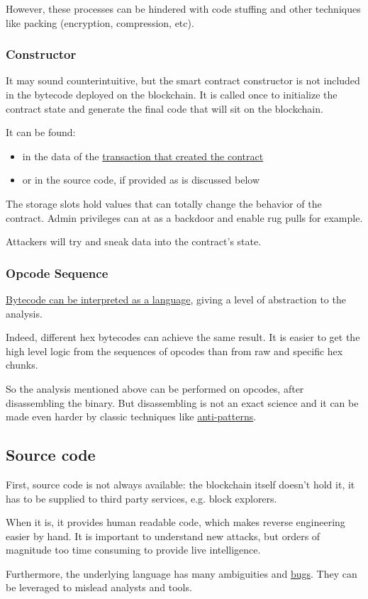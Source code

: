 However, these processes can be hindered with code stuffing and other techniques like packing (encryption, compression, etc).

\subsubsection{Constructor}

It may sound counterintuitive, but the smart contract constructor is not included in the bytecode deployed on the blockchain.
It is called once to initialize the contract state and generate the final code that will sit on the blockchain.

It can be found:

\begin{itemize}
\item{in the data of the \href{https://etherscan.io/tx/0xd66169d4a5feaceaf777b9949ad0e9bc5621a438846a90087e50a5d7b9b0ad1e}{transaction that created the contract}}
\item{or in the source code, if provided as is discussed below}
\end{itemize}

The storage slots hold values that can totally change the behavior of the contract.
Admin privileges can at as a backdoor and enable rug pulls for example.

Attackers will try and sneak data into the contract's state.

\subsubsection{Opcode Sequence}

\href{\urlcodeevmdasm}{Bytecode can be interpreted as a language}, giving a level of abstraction to the analysis.

Indeed, different hex bytecodes can achieve the same result.
It is easier to get the high level logic from the sequences of opcodes than from raw and specific hex chunks.

So the analysis mentioned above can be performed on opcodes, after disassembling the binary.
But disassembling is not an exact science and it can be made even harder by classic techniques like \href{\urlpapereshield}{anti-patterns}.

\subsection{Source code}

First, source code is not always available: the blockchain itself doesn't hold it, it has to be supplied to third party services, e.g. block explorers.

When it is, it provides human readable code, which makes reverse engineering easier by hand.
It is important to understand new attacks, but orders of magnitude too time consuming to provide live intelligence.

Furthermore, the underlying language has many ambiguities and \href{\urldocssoliditybugs}{bugs}.
They can be leveraged to mislead analysts and tools.
